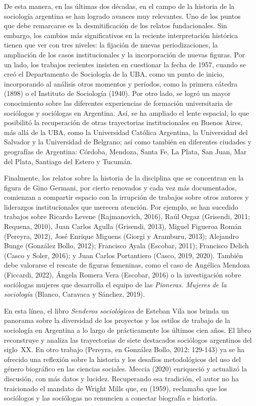 De esta manera, en las últimas dos décadas, en el campo de la historia de la sociología argentina se han logrado avances muy relevantes. Uno de los puntos que debe remarcarse es la desmitificación de los relatos fundacionales. Sin embargo, los cambios más significativos en la reciente interpretación histórica tienen que ver con tres niveles: la fijación de nuevas periodizaciones, la ampliación de los casos institucionales y la incorporación de nuevas figuras. Por un lado, los trabajos recientes insisten en cuestionar la fecha de 1957, cuando se creó el Departamento de Sociología de la UBA, como un punto de inicio, incorporando al análisis otros momentos y períodos, como la primera cátedra (1898) o el Instituto de Sociología (1940). Por otro lado, se logró un mayor conocimiento sobre las diferentes experiencias de formación universitaria de sociólogos y sociólogas en Argentina. Así, se ha ampliado el lente espacial, lo que posibilitó la recuperación de otras trayectorias institucionales en Buenos Aires, más allá de la UBA, como la Universidad Católica Argentina, la Universidad del Salvador y la Universidad de Belgrano; así como también en diferentes ciudades y geografías de Argentina: Córdoba, Mendoza, Santa Fe, La Plata, San Juan, Mar del Plata, Santiago del Estero y Tucumán.

Finalmente, los relatos sobre la historia de la disciplina que se concentran en la figura de Gino Germani, por cierto renovados y cada vez más documentados, comienzan a compartir espacio con la irrupción de trabajos sobre otros autores y liderazgos institucionales que merecen atención. Por ejemplo, se han sucedido trabajos sobre Ricardo Levene (Rajmanovich, 2016), Raúl Orgaz (Grisendi, 2011; Requena, 2010), Juan Carlos Agulla (Grisendi, 2013), Miguel Figueroa Román (Pereyra, 2012), José Enrique Miguens (Giorgi y Aramburu, 2013); Alejandro Bunge (González Bollo, 2012); Francisco Ayala (Escobar, 2011); Francisco Delich (Casco y Soler, 2016); y Juan Carlos Portantiero (Casco, 2019, 2020). También debe valorarse el rescate de figuras femeninas, como el caso de Angélica Mendoza (Ficcardi, 2022), Ángela Romera Vera (Escobar, 2016) o la investigación sobre sociólogas mujeres que desarrolla el equipo de las \emph{Pioneras. Mujeres de la sociología} (Blanco, Caravaca y Sánchez, 2019).

En esta línea, el libro \emph{Senderos sociológicos} de Esteban Vila nos brinda un panorama sobre la diversidad de los proyectos y los estilos de trabajo de la sociología en Argentina a lo largo de prácticamente los últimos cien años. El libro reconstruye y analiza las trayectorias de siete destacados sociólogos argentinos del siglo~XX. En otro trabajo (Pereyra, en González Bollo, 2012: 129-143) ya se ha ofrecido una reflexión sobre la historia y los desafíos metodológicos del uso del género biográfico en las ciencias sociales. Meccia (2020) enriqueció y actualizó la discusión, con más datos y lucidez. Recuperando esa tradición, el autor no ha traicionado el mandato de Wright Mills que, en  (1959), reclamaba que los sociólogos y las sociólogas no renuncien a conectar biografía e historia.


